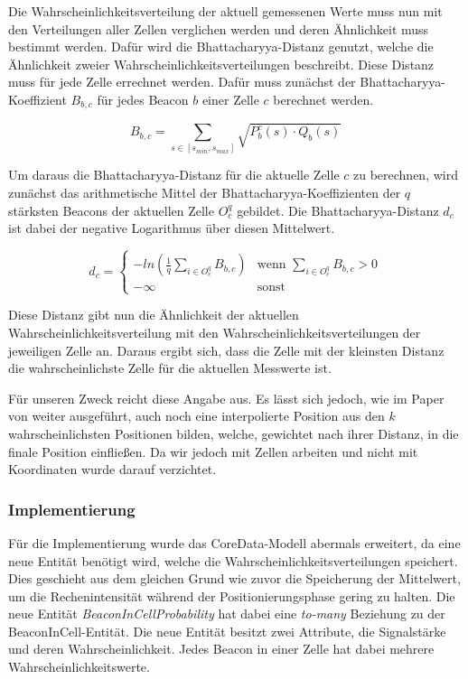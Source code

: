 Die Wahrscheinlichkeitsverteilung der aktuell gemessenen Werte muss nun mit den Verteilungen aller Zellen verglichen werden und deren Ähnlichkeit muss bestimmt werden. Dafür wird die Bhattacharyya-Distanz genutzt, welche die Ähnlichkeit zweier Wahrscheinlichkeitsverteilungen beschreibt. 
Diese Distanz muss für jede Zelle errechnet werden. 
Dafür muss zunächst der Bhattacharyya-Koeffizient $B_{b, c}$ für jedes Beacon $b$ einer Zelle $c$ berechnet werden.

\begin{equation}
	B_{b, c} = \sum_{s \in [s_{min},s_{max}]} \sqrt{P_{b}^{c}(s) \cdot Q_{b}(s)}
\end{equation}

Um daraus die Bhattacharyya-Distanz für die aktuelle Zelle $c$ zu berechnen, wird zunächst das arithmetische Mittel der Bhattacharyya-Koeffizienten der $q$ stärksten Beacons der aktuellen Zelle $O_{c}^{q}$ gebildet. Die Bhattacharyya-Distanz $d_{c}$ ist dabei der negative Logarithmus über diesen Mittelwert.

\begin{equation}
	d_{c}= \begin{cases}
	-ln (\frac{1}{q} \sum_{i \in O_{c}^{q}} B_{b, c}) & \text{wenn } \sum_{i \in O_{c}^{q}} B_{b, c} > 0 \\
	- \infty & \text{sonst}
	\end{cases}
\end{equation}

Diese Distanz gibt nun die Ähnlichkeit der aktuellen Wahrscheinlichkeitsverteilung mit den Wahrscheinlichkeitsverteilungen der jeweiligen Zelle an. Daraus ergibt sich, dass die Zelle mit der kleinsten Distanz die wahrscheinlichste Zelle für die aktuellen Messwerte ist.

Für unseren Zweck reicht diese Angabe aus. Es lässt sich jedoch, wie im Paper von \citet{wifiFingerprintProbability} weiter ausgeführt, auch noch eine interpolierte Position aus den $k$ wahrscheinlichsten Positionen bilden, welche, gewichtet nach ihrer Distanz, in die finale Position einfließen. Da wir jedoch mit Zellen arbeiten und nicht mit Koordinaten wurde darauf verzichtet. 

\subsubsection{Implementierung}
\label{sec:implementation:fingerprinting:positioning:probability:implementiation}
Für die Implementierung wurde das CoreData-Modell abermals erweitert, da eine neue Entität benötigt wird, welche die Wahrscheinlichkeitsverteilungen speichert. Dies geschieht aus dem gleichen Grund wie zuvor die Speicherung der Mittelwert, um die Rechenintensität während der Positionierungsphase gering zu halten.
Die neue Entität \emph{BeaconInCellProbability} hat dabei eine \emph{to-many} Beziehung zu der BeaconInCell-Entität. Die neue Entität besitzt zwei Attribute, die Signalstärke und deren Wahrscheinlichkeit. Jedes Beacon in einer Zelle hat dabei mehrere Wahrscheinlichkeitswerte.



